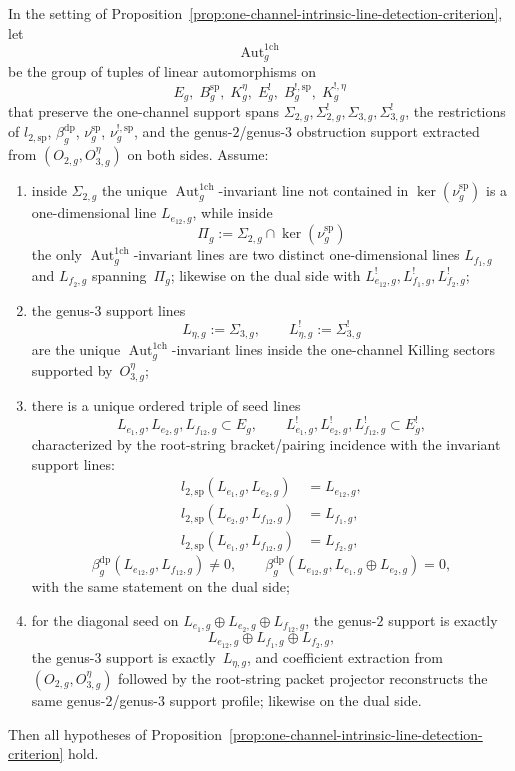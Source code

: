 \begin{proposition}\label{prop:one-channel-automorphism-rigidity-criterion}
In the setting of
Proposition~\textup{\ref{prop:one-channel-intrinsic-line-detection-criterion}},
let
\[
\operatorname{Aut}_g^{\mathrm{1ch}}
\]
be the group of tuples of linear automorphisms on
\[
E_g,\; B_g^{\mathrm{sp}},\; K_g^\eta,\;
E_g^!,\; B_g^{!,\mathrm{sp}},\; K_g^{!,\eta}
\]
that preserve the one-channel support spans
$\Sigma_{2,g},\Sigma_{2,g}^!,\Sigma_{3,g},\Sigma_{3,g}^!$, the
restrictions of $l_{2,\mathrm{sp}}$,
$\beta_g^{\mathrm{dp}}$, $\nu_g^{\mathrm{sp}}$,
$\nu_g^{!,\mathrm{sp}}$, and the genus-$2$/genus-$3$ obstruction
support extracted from $(O_{2,g},O_{3,g}^\eta)$ on both sides.
Assume:
\begin{enumerate}[label=\textup{(\roman*)}]
\item inside $\Sigma_{2,g}$ the unique
  $\operatorname{Aut}_g^{\mathrm{1ch}}$-invariant line not contained in
  $\ker(\nu_g^{\mathrm{sp}})$ is a one-dimensional line
  $L_{e_{12},g}$, while inside
  \[
  \Pi_g:=\Sigma_{2,g}\cap\ker(\nu_g^{\mathrm{sp}})
  \]
  the only $\operatorname{Aut}_g^{\mathrm{1ch}}$-invariant lines are two distinct
  one-dimensional lines $L_{f_1,g}$ and $L_{f_2,g}$ spanning~$\Pi_g$;
  likewise on the dual side with
  $L_{e_{12},g}^!,L_{f_1,g}^!,L_{f_2,g}^!$;
\item the genus-$3$ support lines
  \[
  L_{\eta,g}:=\Sigma_{3,g},
  \qquad
  L_{\eta,g}^!:=\Sigma_{3,g}^!
  \]
  are the unique $\operatorname{Aut}_g^{\mathrm{1ch}}$-invariant lines inside the
  one-channel Killing sectors supported by~$O_{3,g}^\eta$;
\item there is a unique ordered triple of seed lines
  \[
  L_{e_1,g},L_{e_2,g},L_{f_{12},g}\subset E_g,
  \qquad
  L_{e_1,g}^!,L_{e_2,g}^!,L_{f_{12},g}^!\subset E_g^!,
  \]
  characterized by the root-string bracket/pairing incidence with the
  invariant support lines:
  \[
  \begin{alignedat}{1}
  l_{2,\mathrm{sp}}(L_{e_1,g},L_{e_2,g})&=L_{e_{12},g},\\
  l_{2,\mathrm{sp}}(L_{e_2,g},L_{f_{12},g})&=L_{f_1,g},\\
  l_{2,\mathrm{sp}}(L_{e_1,g},L_{f_{12},g})&=L_{f_2,g},
  \end{alignedat}
  \]
  \[
  \beta_g^{\mathrm{dp}}(L_{e_{12},g},L_{f_{12},g})\neq 0,
  \qquad
  \beta_g^{\mathrm{dp}}(L_{e_{12},g},L_{e_1,g}\oplus L_{e_2,g})=0,
  \]
  with the same statement on the dual side;
\item for the diagonal seed on
  $L_{e_1,g}\oplus L_{e_2,g}\oplus L_{f_{12},g}$, the genus-$2$
  support is exactly
  \[
  L_{e_{12},g}\oplus L_{f_1,g}\oplus L_{f_2,g},
  \]
  the genus-$3$ support is exactly~$L_{\eta,g}$, and coefficient
  extraction from $(O_{2,g},O_{3,g}^\eta)$ followed by the root-string
  packet projector reconstructs the same genus-$2$/genus-$3$ support
  profile; likewise on the dual side.
\end{enumerate}
Then all hypotheses of
Proposition~\ref{prop:one-channel-intrinsic-line-detection-criterion}
hold.


\end{proposition}
